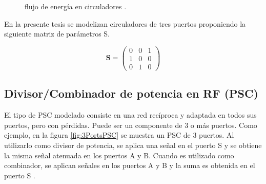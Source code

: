 \begin{figure}[H]
	\centering
	\caption{flujo de energía en circuladores \cite{Semiconductors1998}.}
	\label{fig:circulator}
\end{figure}

En la presente tesis se modelizan circuladores de tres puertos proponiendo la siguiente matriz de parámetros S.

$$
\mathbf{S} = \begin{pmatrix} 0 & 0 & 1\\1 & 0 & 0\\0 & 1 & 0\end{pmatrix}
$$


\subsection{Divisor/Combinador de potencia en RF (PSC)}

El tipo de PSC modelado consiste en una red recíproca y adaptada en todos sus puertos, pero con pérdidas. Puede ser un
componente de 3 o más puertos. Como ejemplo, en la figura \ref{fig:3PortsPSC} se muestra un PSC de 3 puertos. Al utilizarlo como
divisor de potencia, se aplica una señal en el puerto S y se obtiene la misma señal atenuada en los puertos A y B. Cuando es
utilizado como combinador, se aplican señales en los puertos A y B y la suma es obtenida en el puerto S \cite{MiniCircuits2015}.

